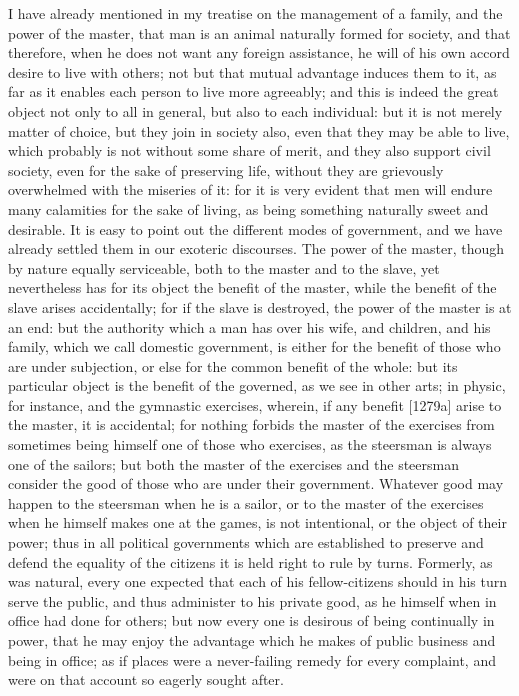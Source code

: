 I have already mentioned in my treatise on the management of a family, and
the power of the master, that man is an animal naturally formed for
society, and that therefore, when he does not want any foreign assistance,
he will of his own accord desire to live with others; not but that mutual
advantage induces them to it, as far as it enables each person to live
more agreeably; and this is indeed the great object not only to all in
general, but also to each individual: but it is not merely matter of
choice, but they join in society also, even that they may be able to live,
which probably is not without some share of merit, and they also support
civil society, even for the sake of preserving life, without they are
grievously overwhelmed with the miseries of it: for it is very evident
that men will endure many calamities for the sake of living, as being
something naturally sweet and desirable. It is easy to point out the
different modes of government, and we have already settled them in our
exoteric discourses. The power of the master, though by nature equally
serviceable, both to the master and to the slave, yet nevertheless has for
its object the benefit of the master, while the benefit of the slave
arises accidentally; for if the slave is destroyed, the power of the
master is at an end: but the authority which a man has over his wife, and
children, and his family, which we call domestic government, is either for
the benefit of those who are under subjection, or else for the common
benefit of the whole: but its particular object is the benefit of the
governed, as we see in other arts; in physic, for instance, and the
gymnastic exercises, wherein, if any benefit [1279a] arise to the master,
it is accidental; for nothing forbids the master of the exercises from
sometimes being himself one of those who exercises, as the steersman is
always one of the sailors; but both the master of the exercises and the
steersman consider the good of those who are under their government.
Whatever good may happen to the steersman when he is a sailor, or to the
master of the exercises when he himself makes one at the games, is not
intentional, or the object of their power; thus in all political
governments which are established to preserve and defend the equality of
the citizens it is held right to rule by turns. Formerly, as was natural,
every one expected that each of his fellow-citizens should in his turn
serve the public, and thus administer to his private good, as he himself
when in office had done for others; but now every one is desirous of being
continually in power, that he may enjoy the advantage which he makes of
public business and being in office; as if places were a never-failing
remedy for every complaint, and were on that account so eagerly sought
after.

